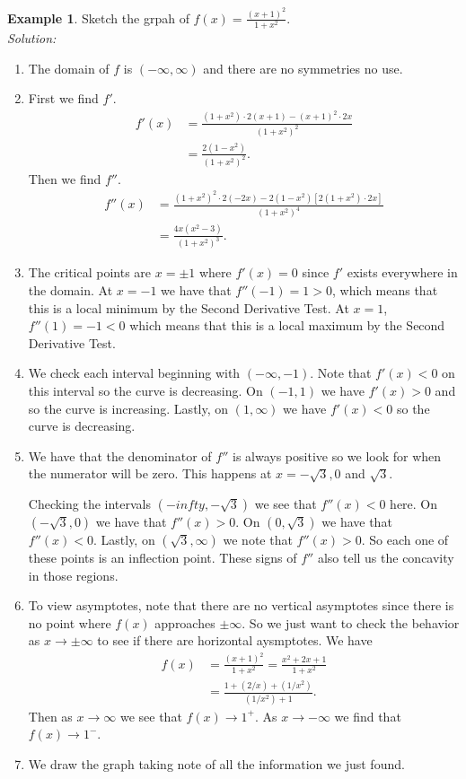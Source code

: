 \documentclass[leqno]{article}
\theoremstyle{definition}
\newtheorem{example}{Example}[section]
\theoremstyle{remark}
\theoremstyle{theorem}
\begin{document}
\begin{example}
Sketch the grpah of $f(x)=\frac{(x+1)^2}{1+x^2}$.\\
\noindent \emph{Solution:}~
\begin{enumerate}[1.]
\item The domain of $f$ is $(-\infty, \infty)$ and there are no symmetries no use.
\item First we find $f'$.
\begin{align*}
f'(x)&=\frac{(1+x^2)\cdot 2(x+1)-(x+1)^2\cdot 2x}{(1+x^2)^2}\\
&=\frac{2(1-x^2)}{(1+x^2)^2}.
\end{align*}
Then we find $f''$.
\begin{align*}
f''(x)&=\frac{(1+x^2)^2\cdot 2(-2x)-2(1-x^2)[2(1+x^2)\cdot 2x]}{(1+x^2)^4}\\
&= \frac{4x(x^2-3)}{(1+x^2)^3}.
\end{align*}
\item The critical points are $x=\pm 1$ where $f'(x)=0$ since $f'$ exists everywhere in the domain. At $x=-1$ we have that $f''(-1)=1>0$, which means that this is a local minimum by the Second Derivative Test. At $x=1$, $f''(1)=-1<0$ which means that this is a local maximum by the Second Derivative Test.
\item We check each interval beginning with $(-\infty,-1)$. Note that $f'(x)<0$ on this interval so the curve is decreasing. On $(-1,1)$ we have $f'(x)>0$ and so the curve is increasing. Lastly, on $(1,\infty)$ we have $f'(x)<0$ so the curve is decreasing.
\item We have that the denominator of $f''$ is always positive so we look for when the numerator will be zero.  This happens at $x=-\sqrt{3},0$ and $\sqrt{3}$. 

Checking the intervals $(-infty, -\sqrt{3})$ we see that $f''(x)<0$ here. On $(-\sqrt{3},0)$ we have that $f''(x)>0$. On $(0,\sqrt{3})$ we have that $f''(x)<0$. Lastly, on $(\sqrt{3},\infty)$ we note that $f''(x)>0$. So each one of these points is an inflection point. These signs of $f''$ also tell us the concavity in those regions.
\item To view asymptotes, note that there are no vertical asymptotes since there is no point where $f(x)$ approaches $\pm \infty$. So we just want to check the behavior as $x\to \pm \infty$ to see if there are horizontal aysmptotes. We have
\begin{align*}
f(x)&=\frac{(x+1)^2}{1+x^2}=\frac{x^2+2x+1}{1+x^2}\\
&=\frac{1+(2/x)+(1/x^2)}{(1/x^2)+1}.
\end{align*}
Then as $x\to \infty$ we see that $f(x)\to 1^+$. As $x\to -\infty$ we find that $f(x)\to 1^-$.
\item We draw the graph taking note of all the information we just found.
\vspace*{5cm}\\
\end{enumerate}
\end{example}
\end{document}
